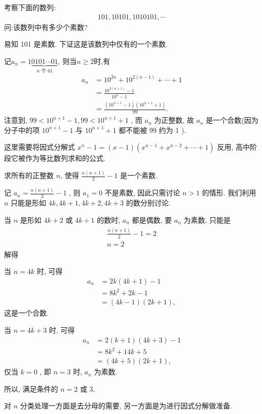 \begin{example}\label{素数与合数的性质-例2}
	考察下面的数列:
	\begin{align*}
		101,10101,1010101, \cdots
	\end{align*}
	问:该数列中有多少个素数?
\end{example}
\begin{solution}
	易知 101 是素数. 下证这是该数列中仅有的一个素数.

	记$a_{n}=1\underbrace{0101 \cdots 01}_{n \text { 个 } 01} $, 则当$n \geqslant 2$时,有
	\begin{align*}
		a_{n} & =10^{2 n}+10^{2(n-1)}+\cdots+1                               \\
		      & =\frac{10^{2(n+1)}-1}{10^{2}-1}                              \\
		      & =\frac{\left(10^{n+1}-1\right)\left(10^{n+1}+1\right)}{99} .
	\end{align*}
	注意到,  $99<10^{n+1}-1,99<10^{n+1}+1$ , 而 $a_{n}$ 为正整数, 故 $a_{n}$ 是一个合数(因为分子中的项 $10^{n+1}-1$ 与 $10^{n+1}+1$ 都不能被 99 约为 1 ).
\end{solution}
\begin{note}
	这里需要将因式分解式 $x^{n}-1=(x-1)\left(x^{n-1}+x^{n-2}+\cdots+1\right)$ 反用, 高中阶段它被作为等比数列求和的公式.
\end{note}

\begin{example}
	求所有的正整数 $n$, 使得 $\frac{n(n+1)}{2}-1$ 是一个素数.
\end{example}
\begin{solution}
	记 $a_{n}=\frac{n(n+1)}{2}-1$ , 则 $a_{1}=0$ 不是素数, 因此只需讨论 $n>1$ 的情形. 我们利用 $n$ 只能是形如 $4 k ,  4 k+1 ,  4 k+2 ,  4 k+3$ 的数分别讨论.

	当 $n$ 是形如 $4 k+2$ 或 $4 k+1$ 的数时, $a_{n}$ 都是偶数, 要 $a_{n}$ 为素数, 只能是
	\begin{align*}
		\begin{gathered}
			\frac{n(n+1)}{2}-1=2 \\
			n=2
		\end{gathered}
	\end{align*}
	解得

	当 $n=4 k$ 时, 可得\begin{align}
		a_{n} & =2 k(4 k+1)-1    \\
		      & =8 k^{2}+2 k-1   \\
		      & =(4 k-1)(2 k+1),
	\end{align}
	这是一个合数.

	当 $n=4 k+3$ 时, 可得
	\begin{align}
		a_{n} & =2(k+1)(4 k+3)-1 \\
		      & =8 k^{2}+14 k+5  \\
		      & =(4 k+5)(2 k+1),
	\end{align}
	仅当 $k=0$ , 即 $n=3$ 时,  $a_{n}$ 为素数.

	所以, 满足条件的 $n=2$ 或 $3$.
\end{solution}
\begin{note}
	对 $n$ 分类处理一方面是去分母的需要, 另一方面是为进行因式分解做准备.
\end{note}

